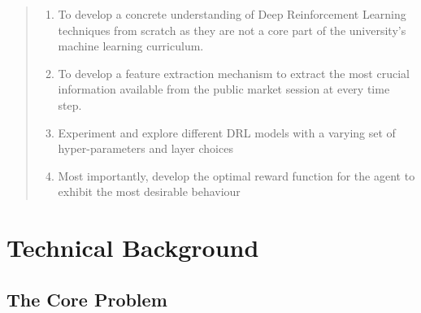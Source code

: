 \documentclass[ %
                    author={Ashwinder Khurana},
                supervisor={Prof Dave Cliff},
                    degree={MEng},
                     title={The Deeply Reinforced Trader},
                  subtitle={},
                      type={enterprise},
                      year={2020} ]{dissertation}
\begin{document}
\begin{quote}
\begin{enumerate}
\item To develop a concrete understanding of Deep Reinforcement Learning techniques from scratch as they are not a core part of the university's machine learning curriculum.
\item To develop a feature extraction mechanism to extract the most crucial information available from the public market session at every time step.
\item Experiment and explore different DRL models with a varying set of hyper-parameters and layer choices
\item Most importantly, develop the optimal reward function for the agent to exhibit the most desirable behaviour 
\end{enumerate}
\end{quote}


\chapter{Technical Background}
\label{chap:technical}




%
\section{The Core Problem}
\vspace{0.5cm}
\end{document}

